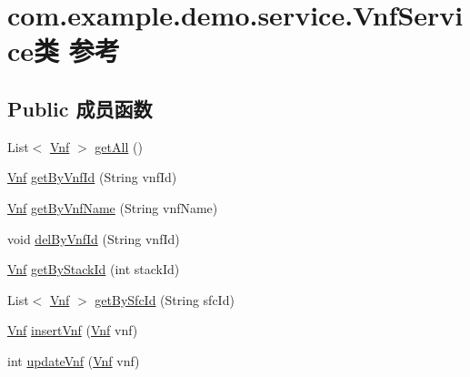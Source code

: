 \hypertarget{classcom_1_1example_1_1demo_1_1service_1_1_vnf_service}{}\section{com.\+example.\+demo.\+service.\+Vnf\+Service类 参考}
\label{classcom_1_1example_1_1demo_1_1service_1_1_vnf_service}
\subsection*{Public 成员函数}
\begin{DoxyCompactItemize}
\item 
List$<$ \mbox{\hyperlink{classcom_1_1example_1_1demo_1_1modular_1_1_vnf}{Vnf}} $>$ \mbox{\hyperlink{classcom_1_1example_1_1demo_1_1service_1_1_vnf_service_ac9cd2ea5292b0df2d3ddd09364529bc3}{get\+All}} ()
\item 
\mbox{\hyperlink{classcom_1_1example_1_1demo_1_1modular_1_1_vnf}{Vnf}} \mbox{\hyperlink{classcom_1_1example_1_1demo_1_1service_1_1_vnf_service_af341112bc9259ba69a851dfa00d49e78}{get\+By\+Vnf\+Id}} (String vnf\+Id)
\item 
\mbox{\hyperlink{classcom_1_1example_1_1demo_1_1modular_1_1_vnf}{Vnf}} \mbox{\hyperlink{classcom_1_1example_1_1demo_1_1service_1_1_vnf_service_aeccec0d2f363d070a1a7f89c77b2780e}{get\+By\+Vnf\+Name}} (String vnf\+Name)
\item 
void \mbox{\hyperlink{classcom_1_1example_1_1demo_1_1service_1_1_vnf_service_a0514a218df0d43cf90a025371974cbbe}{del\+By\+Vnf\+Id}} (String vnf\+Id)
\item 
\mbox{\hyperlink{classcom_1_1example_1_1demo_1_1modular_1_1_vnf}{Vnf}} \mbox{\hyperlink{classcom_1_1example_1_1demo_1_1service_1_1_vnf_service_acc9a76f8b75765e4834585e9aae36145}{get\+By\+Stack\+Id}} (int stack\+Id)
\item 
List$<$ \mbox{\hyperlink{classcom_1_1example_1_1demo_1_1modular_1_1_vnf}{Vnf}} $>$ \mbox{\hyperlink{classcom_1_1example_1_1demo_1_1service_1_1_vnf_service_a60ea7404996dd3ea6472b91a8233720f}{get\+By\+Sfc\+Id}} (String sfc\+Id)
\item 
\mbox{\hyperlink{classcom_1_1example_1_1demo_1_1modular_1_1_vnf}{Vnf}} \mbox{\hyperlink{classcom_1_1example_1_1demo_1_1service_1_1_vnf_service_a625a4e37d842de6d20e785889d4091bc}{insert\+Vnf}} (\mbox{\hyperlink{classcom_1_1example_1_1demo_1_1modular_1_1_vnf}{Vnf}} vnf)
\item 
int \mbox{\hyperlink{classcom_1_1example_1_1demo_1_1service_1_1_vnf_service_a2c08b27701f636df4563bb54db42d421}{update\+Vnf}} (\mbox{\hyperlink{classcom_1_1example_1_1demo_1_1modular_1_1_vnf}{Vnf}} vnf)
\end{DoxyCompactItemize}
